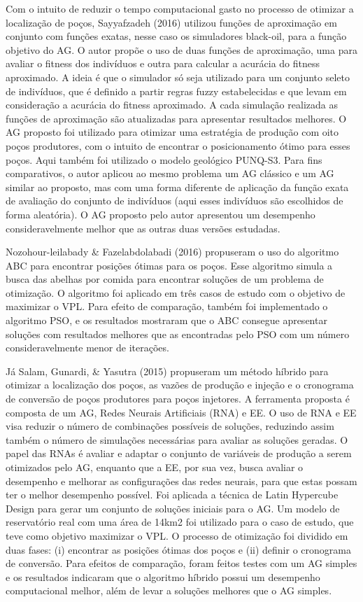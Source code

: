 Com o intuito de reduzir o tempo computacional gasto no processo de otimizar a localização de poços, Sayyafzadeh (2016) utilizou funções de aproximação em conjunto com funções exatas, nesse caso os simuladores black-oil, para a função objetivo do AG. O autor propõe o uso de duas funções de aproximação, uma para avaliar o fitness dos indivíduos e outra para calcular a acurácia do fitness aproximado. A ideia é que o simulador só seja utilizado para um conjunto seleto de indivíduos, que é definido a partir regras fuzzy estabelecidas e que levam em consideração a acurácia do fitness aproximado. A cada simulação realizada as funções de aproximação são atualizadas para apresentar resultados melhores. O AG proposto foi utilizado para otimizar uma estratégia de produção com oito poços produtores, com o intuito de encontrar o posicionamento ótimo para esses poços. Aqui também foi utilizado o modelo geológico PUNQ-S3. Para fins comparativos, o autor aplicou ao mesmo problema um AG clássico e um AG similar ao proposto, mas com uma forma diferente de aplicação da função exata de avaliação do conjunto de indivíduos (aqui esses indivíduos são escolhidos de forma aleatória). O AG proposto pelo autor apresentou um desempenho consideravelmente melhor que as outras duas versões estudadas.

Nozohour-leilabady \& Fazelabdolabadi (2016) propuseram o uso do algoritmo ABC para encontrar posições ótimas para os poços. Esse algoritmo simula a busca das abelhas por comida para encontrar soluções de um problema de otimização. O algoritmo foi aplicado em três casos de estudo com o objetivo de maximizar o VPL. Para efeito de comparação, também foi implementado o algoritmo PSO, e os resultados mostraram que o ABC consegue apresentar soluções com resultados melhores que as encontradas pelo PSO com um número consideravelmente menor de iterações.

Já Salam, Gunardi, \& Yasutra (2015) propuseram um método híbrido para otimizar a localização dos poços, as vazões de produção e injeção e o cronograma de conversão de poços produtores para poços injetores. A ferramenta proposta é composta de um AG, Redes Neurais Artificiais (RNA) e EE. O uso de RNA e EE visa reduzir o número de combinações possíveis de soluções, reduzindo assim também o número de simulações necessárias para avaliar as soluções geradas. O papel das RNAs é avaliar e adaptar o conjunto de variáveis de produção a serem otimizados pelo AG, enquanto que a EE, por sua vez, busca avaliar o desempenho e melhorar as configurações das redes neurais, para que estas possam ter o melhor desempenho possível. Foi aplicada a técnica de Latin Hypercube Design para gerar um conjunto de soluções iniciais para o AG. Um modelo de reservatório real com uma área de 14km2 foi utilizado para o caso de estudo, que teve como objetivo maximizar o VPL. O processo de otimização foi dividido em duas fases: (i) encontrar as posições ótimas dos poços e (ii) definir o cronograma de conversão. Para efeitos de comparação, foram feitos testes com um AG simples e os resultados indicaram que o algoritmo híbrido possui um desempenho computacional melhor, além de levar a soluções melhores que o AG simples.

